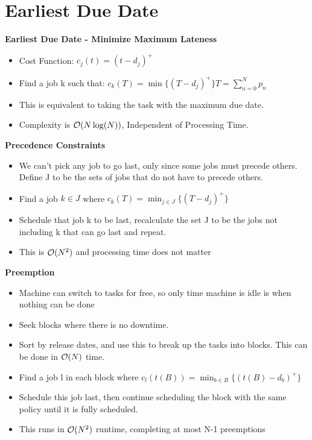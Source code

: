 \documentclass[grey,handout]{beamer}
\renewcommand{\frametitle}[1]{\begin{center}\textbf{#1}\end{center}}
\def\BigO{{\cal O}}
\begin{document}
\section{Earliest Due Date}

\begin{frame}
  \frametitle{Earliest Due Date - Minimize Maximum Lateness}
  \begin{itemize}
  \item Cost Function: $c_j(t) = (t - d_j)^+$
  \item Find a job k such that: $c_k(T) = \min \{ (T - d_j)^+ \} T =
      \sum_{n=0}^N p_n$
  \item This is equivalent to taking the task with the maximum due
        date.
  \item Complexity is $\BigO ( N \log( N ) )$, Independent of
          Processing Time.
  \end{itemize}
\end{frame}

\begin{frame}
  \frametitle{Precedence Constraints}
  \begin{itemize}
  \item We can't pick any job to go last, only since some jobs must
    precede others. Define J to be the sets of jobs that do not have
    to precede others.
  \item Find a job $k \in J$ where $c_k(T) = \min_{j \in J} \{ (T - d_j
      )^+ \}$
  \item Schedule that job k to be last, recalculate the set J to
        be the jobs not including k that can go last and repeat.
  \item This is $\BigO ( N^2 )$ and processing time does not matter
  \end{itemize}
\end{frame}

\begin{frame}
  \frametitle{ Preemption }
  \begin{itemize}
  \item Machine can switch to tasks for free, so only time machine is
    idle is when nothing can be done
  \item Seek blocks where there is no downtime.
  \item Sort by release dates, and use this to break up the tasks into
    blocks. This can be done in $\BigO ( N )$ time.
  \item Find a job l in each block where $c_l(t(B) ) = \min_{b \in B}
    \{ (t(B) - d_b)^+ \}$
  \item Schedule this job last, then continue scheduling the block
    with the same policy until it is fully scheduled.
  \item This runs in $\BigO( N^2 )$ runtime, completing at most N-1 preemptions
  \end{itemize}
\end{frame}
\end{document}
